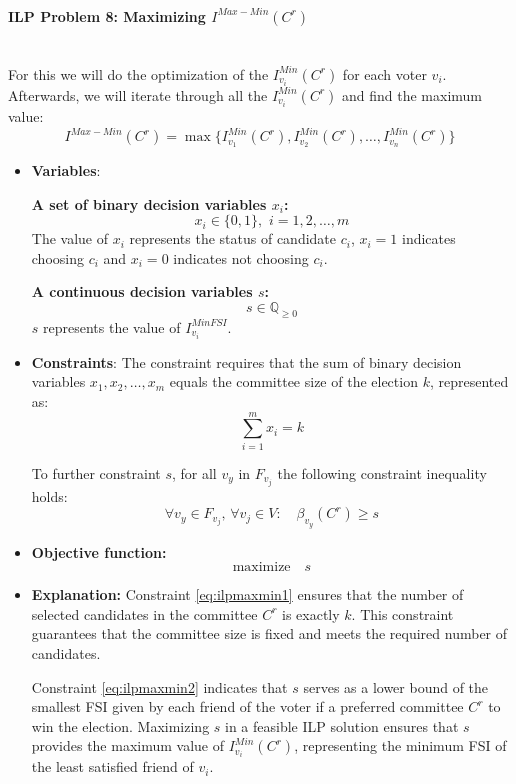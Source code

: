 \documentclass{article}
\begin{document}
\paragraph*{ILP Problem 8: Maximizing  $I^{Max-Min}(C^{r})$}\mbox{} \\
For this we will do the optimization of the $I_{v_i}^{Min}(C^{r})$ for each voter $v_i$. Afterwards, we will iterate through all the $I_{v_i}^{Min}(C^{r})$ and find the maximum value:
  \[I^{Max-Min}(C^{r}) = \max\{ I_{v_1}^{Min}(C^{r}), I_{v_2}^{Min}(C^{r}), \ldots, I_{v_n}^{Min}(C^{r}) \}\]
\begin{itemize}
  \item \textbf{Variables}: 

\textbf{A set of binary decision variables $x_i$:} \[  x_i \in \{0, 1\} , \,\, i=1,2,\dots, m \] The value of $x_i$ represents the status of candidate $c_i$, \(x_i = 1\) indicates choosing $c_i$ and \(x_i = 0\) indicates not choosing $c_i$.


\textbf{A continuous decision variables $s$:} 
\[  s\in \mathbb{Q}_{\geq 0} \] 
$s$ represents the value of $I_{v_i}^{MinFSI}$.
    \item \textbf{Constraints}:
The constraint requires that the sum of binary decision variables \(x_1, x_2, \ldots, x_m\) equals the committee size of the election \(k\), represented as:
\begin{equation} \sum_{i=1}^m x_i = k     \label{eq:ilpmaxmin1}
\end{equation}

To further constraint $s$, for all $ v_y $ in $F_{v_j} $ the following constraint inequality holds:
\begin{equation} \forall v_y \in F_{v_j}, \,  \forall v_j \in V :\quad \beta_{v_y}(C^{r}) \geq s   \label{eq:ilpmaxmin2}
\end{equation}
  
  \item  \textbf{Objective function:}
  \[\text{maximize} \quad s\]

  \item  \textbf{Explanation:}
Constraint \ref{eq:ilpmaxmin1} ensures that the number of selected candidates in the committee \(C^r\) is exactly \(k\). This constraint guarantees that the committee size is fixed and meets the required number of candidates.

Constraint \ref{eq:ilpmaxmin2} indicates that \(s\) serves as a lower bound of the smallest FSI given by each friend of the voter if a preferred committee \(C^r\) to win the election. Maximizing \(s\) in a feasible ILP solution ensures that \(s\) provides the maximum value of \(I_{v_i}^{Min}(C^{r})\), representing the minimum FSI of the least satisfied friend of $v_i$. 


\end{itemize}
\end{document}
